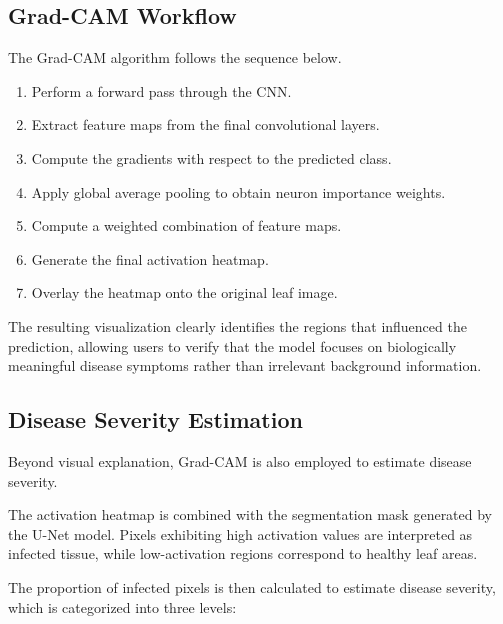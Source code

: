 \subsection{Grad-CAM Workflow}

The Grad-CAM algorithm follows the sequence below.

\begin{enumerate}[leftmargin=*,label=\textbf{G\arabic*.}]

\item Perform a forward pass through the CNN.

\item Extract feature maps from the final convolutional layers.

\item Compute the gradients with respect to the predicted class.

\item Apply global average pooling to obtain neuron importance weights.

\item Compute a weighted combination of feature maps.

\item Generate the final activation heatmap.

\item Overlay the heatmap onto the original leaf image.

\end{enumerate}

The resulting visualization clearly identifies the regions that influenced the prediction, allowing users to verify that the model focuses on biologically meaningful disease symptoms rather than irrelevant background information.

\subsection{Disease Severity Estimation}

Beyond visual explanation, Grad-CAM is also employed to estimate disease severity.

The activation heatmap is combined with the segmentation mask generated by the U-Net model. Pixels exhibiting high activation values are interpreted as infected tissue, while low-activation regions correspond to healthy leaf areas.

The proportion of infected pixels is then calculated to estimate disease severity, which is categorized into three levels:


